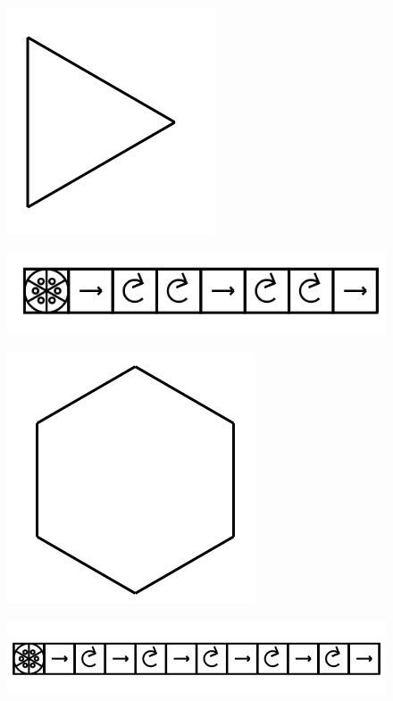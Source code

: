 \documentclass[11pt]{article}
\begin{document}
\begin{figure}
\includegraphics[scale=0.3]{image9.png}
\end{figure}
\begin{figure}
\includegraphics[scale=0.3]{image10.png}
\end{figure}

\begin{figure}
\includegraphics[scale=0.3]{image11.png}
\end{figure}
\begin{figure}
\includegraphics[scale=0.3]{image12.png}
\end{figure}
\end{document}
